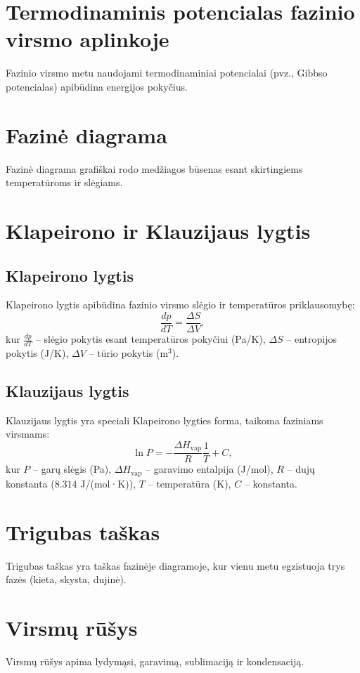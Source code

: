 \documentclass[a4paper,12pt]{article}
\begin{document}
\section{Termodinaminis potencialas fazinio virsmo aplinkoje}
Fazinio virsmo metu naudojami termodinaminiai potencialai (pvz., Gibbso potencialas) apibūdina energijos pokyčius.

\section{Fazinė diagrama}
Fazinė diagrama grafiškai rodo medžiagos būsenas esant skirtingiems temperatūroms ir slėgiams.

\section{Klapeirono ir Klauzijaus lygtis}

\subsection{Klapeirono lygtis}
Klapeirono lygtis apibūdina fazinio virsmo slėgio ir temperatūros priklausomybę:
\[
\frac{dp}{dT} = \frac{\Delta S}{\Delta V},
\]
kur $\frac{dp}{dT}$ – slėgio pokytis esant temperatūros pokyčiui (Pa/K), $\Delta S$ – entropijos pokytis (J/K), $\Delta V$ – tūrio pokytis (m\(^3\)).

\subsection{Klauzijaus lygtis}
Klauzijaus lygtis yra speciali Klapeirono lygties forma, taikoma faziniams virsmams:
\[
\ln P = -\frac{\Delta H_{\text{vap}}}{R} \frac{1}{T} + C,
\]
kur $P$ – garų slėgis (Pa), $\Delta H_{\text{vap}}$ – garavimo entalpija (J/mol), $R$ – dujų konstanta ($8.314$ J/(mol·K)), $T$ – temperatūra (K), $C$ – konstanta.

\section{Trigubas taškas}
Trigubas taškas yra taškas fazinėje diagramoje, kur vienu metu egzistuoja trys fazės (kieta, skysta, dujinė).

\section{Virsmų rūšys}
Virsmų rūšys apima lydymąsi, garavimą, sublimaciją ir kondensaciją.
\end{document}
